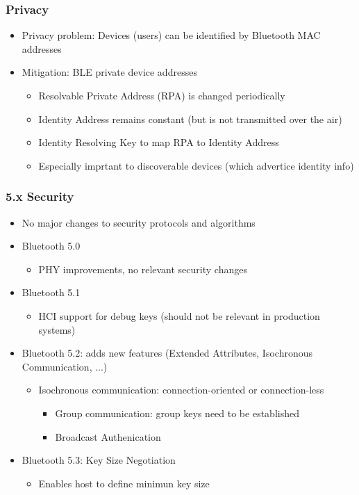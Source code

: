 \subsubsection{Privacy}
\begin{itemize}
  \item Privacy problem: Devices (users) can be identified by Bluetooth MAC addresses
  \item Mitigation: BLE private device addresses 
    \begin{itemize}
      \item Resolvable Private Address (RPA) is changed periodically
      \item Identity Address remains constant (but is not transmitted over the air) 
      \item Identity Resolving Key to map RPA to Identity Address 
      \item Especially imprtant to discoverable devices (which advertice identity info) 
    \end{itemize}
\end{itemize}

\subsubsection{5.x Security}
\begin{itemize}
  \item No major changes to security protocols and algorithms
  \item Bluetooth 5.0 
    \begin{itemize}
      \item PHY improvements, no relevant security changes
    \end{itemize}
  \item Bluetooth 5.1 
    \begin{itemize}
      \item HCI support for debug keys (should not be relevant in production systems)
    \end{itemize}
  \item Bluetooth 5.2: adds new features (Extended Attributes, Isochronous Communication, ...)
    \begin{itemize}
      \item Isochronous communication: connection-oriented or connection-less
        \begin{itemize}
          \item Group communication: group keys need to be established
          \item Broadcast Authenication 
        \end{itemize}
    \end{itemize}
  \item Bluetooth 5.3: Key Size Negotiation 
    \begin{itemize}
      \item Enables host to define minimun key size
    \end{itemize}
\end{itemize}

